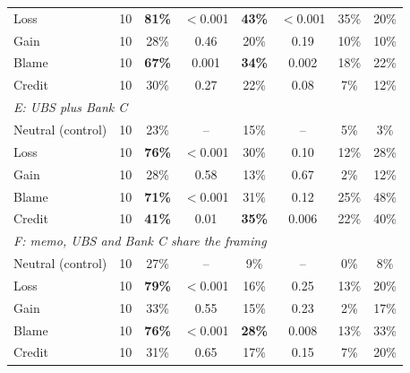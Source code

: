 \documentclass[11pt]{article}
\begin{document}
\begin{table}[htbp]
\begin{tabular}{l c c c c c c c}
Loss & 10 & \textbf{81\%} & $<$0.001 & \textbf{43\%} & $<$0.001 & 35\% & 20\% \\
Gain & 10 & 28\% & 0.46 & 20\% & 0.19 & 10\% & 10\% \\
Blame & 10 & \textbf{67\%} & 0.001 & \textbf{34\%} & 0.002 & 18\% & 22\% \\
Credit & 10 & 30\% & 0.27 & 22\% & 0.08 & 7\% & 12\% \\
\midrule
\multicolumn{8}{l}{\textit{E: UBS plus Bank C}} \\
Neutral (control) & 10 & 23\% & -- & 15\% & -- & 5\% & 3\% \\
Loss & 10 & \textbf{76\%} & $<$0.001 & 30\% & 0.10 & 12\% & 28\% \\
Gain & 10 & 28\% & 0.58 & 13\% & 0.67 & 2\% & 12\% \\
Blame & 10 & \textbf{71\%} & $<$0.001 & 31\% & 0.12 & 25\% & 48\% \\
Credit & 10 & \textbf{41\%} & 0.01 & \textbf{35\%} & 0.006 & 22\% & 40\% \\
\midrule
\multicolumn{8}{l}{\textit{F: memo, UBS and Bank C share the framing}} \\
Neutral (control) & 10 & 27\% & -- & 9\% & -- & 0\% & 8\% \\
Loss & 10 & \textbf{79\%} & $<$0.001 & 16\% & 0.25 & 13\% & 20\% \\
Gain & 10 & 33\% & 0.55 & 15\% & 0.23 & 2\% & 17\% \\
Blame & 10 & \textbf{76\%} & $<$0.001 & \textbf{28\%} & 0.008 & 13\% & 33\% \\
Credit & 10 & 31\% & 0.65 & 17\% & 0.15 & 7\% & 20\% \\
\bottomrule
\end{tabular}
\end{table}
\end{document}
